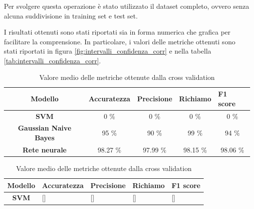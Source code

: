 Per svolgere questa operazione è stato utilizzato il dataset completo, ovvero
senza alcuna suddivisione in training set e test set.

I risultati ottenuti sono stati riportati sia in forma numerica che grafica
per facilitare la comprensione. In particolare, i valori delle metriche ottenuti
sono stati riportati in figura \ref{fig:intervalli_confidenza_corr} e
nella tabella \ref{tab:intervalli_confidenza_corr}.

\begin{table}[!ht]
    \begin{subtable}[h]{1\textwidth}
        \centering
        \begin{tabular}{@{}cllll@{}}
            \toprule
            \rowcolor[HTML]{EFEFEF}
            \textbf{Modello}                                      & \textbf{Accuratezza}         & \textbf{Precisione}          & \textbf{Richiamo}            & \textbf{F1 score}            \\ \midrule
            \cellcolor[HTML]{EFEFEF}\textbf{SVM}                  & \multicolumn{1}{c}{0 \%}     & \multicolumn{1}{c}{0 \%}     & \multicolumn{1}{c}{0 \%}     & \multicolumn{1}{c}{0 \%}     \\
            \cellcolor[HTML]{EFEFEF}\textbf{Gaussian Naive Bayes} & \multicolumn{1}{c}{95 \%}    & \multicolumn{1}{c}{90 \%}    & \multicolumn{1}{c}{99 \%}    & \multicolumn{1}{c}{94 \%}    \\
            \cellcolor[HTML]{EFEFEF}\textbf{Rete neurale}         & \multicolumn{1}{c}{98.27 \%} & \multicolumn{1}{c}{97.99 \%} & \multicolumn{1}{c}{98.15 \%} & \multicolumn{1}{c}{98.06 \%} \\ \bottomrule
        \end{tabular}
        \caption{Valore medio delle metriche ottenute dalla cross validation}
        \label{tab:risultati_cross_val_corr}
    \end{subtable}
    \hfill
    \begin{subtable}[h]{1\textwidth}
        \centering
        \begin{tabular}{@{}cllll@{}}
            \toprule
            \rowcolor[HTML]{EFEFEF}
            \textbf{Modello}                                      & \textbf{Accuratezza} & \textbf{Precisione} & \textbf{Richiamo}  & \textbf{F1 score}  \\ \midrule
            \cellcolor[HTML]{EFEFEF}\textbf{SVM}                  & []                   & []                  & []                 & []                 \\

\end{tabular}
\end{subtable}
\end{table}
